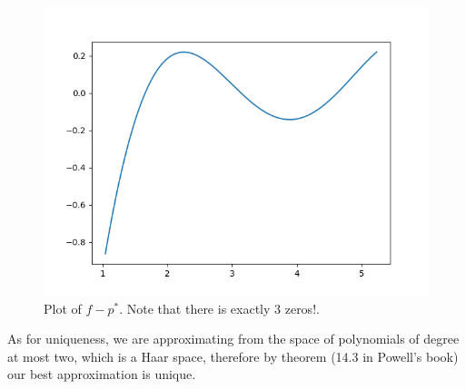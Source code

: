 \begin{solution}
\begin{figure}[!ht]
  \centering
  \includegraphics[scale = 0.5]{error.png}
  \caption{Plot of $f - p^*$. Note that there is exactly 3 zeros!.}
  \label{fig:task_3:error}
\end{figure}

As for uniqueness, we are approximating from the space of polynomials
of degree at most two, which is a Haar space, therefore by theorem
(14.3 in Powell's book) our best approximation is unique.
\end{solution}



